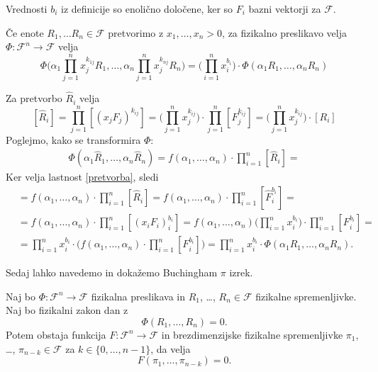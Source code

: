 \documentclass[mat2, tisk]{fmfdelo}
\begin{document}
\begin{opomba}
Vrednosti $b_i$ iz definicije so enolično določene, ker so $F_i$ 
bazni vektorji za $\mathcal{F}$.
\end{opomba}

\begin{lema}
\label{lema_pretvorba}
Če enote $R_1, \dots R_n \in \mathcal{F}$ pretvorimo z $x_1, \dots, x_n > 0$, za 
fizikalno preslikavo velja 
$\Phi: \mathcal{F}^n \rightarrow \mathcal{F}$ velja 
\begin{equation}
\Phi\Big(\alpha_1\prod_{j=1}^n x_j^{k_{1j}} R_1, \dots, \alpha_n \prod_{j=1}^n x_j^{k_{nj}} R_n\Big) = \Big(\prod_{i=1}^n x_i^{b_i}\Big)\cdot \Phi(\alpha_1 R_1, \dots, \alpha_n R_n)
\end{equation}
\end{lema}

\begin{dokaz}
Za pretvorbo $\hat{R}_i$ velja 
$$
[\hat{R}_i] = \prod_{j=1}^n [(x_j F_j)^{k_{ij}}] = \Big(\prod_{j=1}^n x_j^{k_{ij}}\Big)\cdot \prod_{j=1}^n [F_j^{k_{ij}}] = \Big(\prod_{j=1}^n x_j^{k_{ij}}\Big) \cdot [R_i]
$$
Poglejmo, kako se transformira $\Phi$:
\begin{align*}
\Phi(\alpha_1 \hat{R}_1, \dots, \alpha_n \hat{R}_n) = f(\alpha_1, \dots, \alpha_n) \cdot \prod_{i=1}^n [\hat{R}_i] = 
\end{align*}
Ker velja lastnost \ref{pretvorba}, sledi
\begin{align*}
&= f(\alpha_1, \dots, \alpha_n) \cdot \prod_{i=1}^n [\hat{R}_i] = f(\alpha_1, \dots, \alpha_n) \cdot \prod_{i=1}^n [\hat{F}_i^{b_i}] = \\
&= f(\alpha_1, \dots, \alpha_n) \cdot \prod_{i=1}^n [(x_i F_i)_i^{b_i}] = f(\alpha_1, \dots, \alpha_n) \Big(\prod_{i=1}^n x_i^{b_i}\Big) \cdot \prod_{i=1}^n [F_i^{b_i}] = \\
&= \prod_{i=1}^n x_i^{b_i} \cdot \Big(f(\alpha_1, \dots, \alpha_n)\cdot \prod_{i=1}^n [F_i^{b_i}] \Big) = \prod_{i=1}^n x_i^{b_i} \cdot \Phi(\alpha_1 R_1, \dots, \alpha_n R_n).
\end{align*}
\end{dokaz}

Sedaj lahko navedemo in dokažemo Buchingham $\pi$ izrek.

 \begin{izrek}[Buchingham $\pi$]
 Naj bo $\Phi: \mathcal{F}^n \rightarrow \mathcal{F}$ fizikalna preslikava in 
 $R_1$, \dots, $R_n \in \mathcal{F}$ fizikalne spremenljivke. Naj bo fizikalni zakon dan z 
 \begin{equation}
 \Phi(R_1, \dots, R_n) = 0.
 \end{equation}
 Potem obstaja funkcija 
 $F: \mathcal{F}^n \rightarrow \mathcal{F}$ in brezdimenzijske fizikalne spremenljivke 
 $\pi_1$, \dots, $\pi_{n-k} \in \mathcal{F}$ za $k \in \{0, \dots, n-1\}$, da velja
 \begin{equation}
   F(\pi_1, \dots, \pi_{n-k}) = 0.
 \end{equation}
 \end{izrek}
\end{document}
